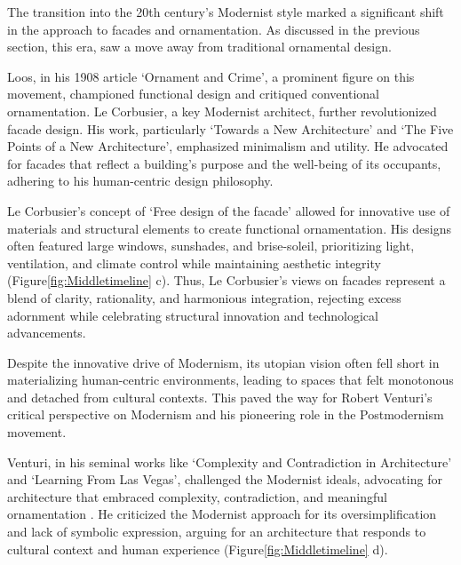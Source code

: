 
The transition into the 20th century's Modernist style marked a significant shift in the approach to facades and ornamentation.
As discussed in the previous section, this era, saw a move away from traditional ornamental design.

Loos, in his 1908 article `Ornament and Crime', a prominent figure on this movement, championed functional design and critiqued conventional ornamentation\cite{Saglam2014}.
Le Corbusier, a key Modernist architect, further revolutionized facade design.
His work, particularly `Towards a New Architecture'\cite{Studio2a2023} and `The Five Points of a New Architecture', emphasized minimalism and utility.
He advocated for facades that reflect a building's purpose and the well-being of its occupants, adhering to his human-centric design philosophy\cite{Virseda2021}.

Le Corbusier's concept of `Free design of the facade'\cite{Corbusier1986} allowed for innovative use of materials and structural elements to create functional ornamentation.
His designs often featured large windows, sunshades, and brise-soleil, prioritizing light, ventilation, and climate control while maintaining aesthetic integrity (Figure\ref{fig:Middletimeline} c).
Thus, Le Corbusier's views on facades represent a blend of clarity, rationality, and harmonious integration, rejecting excess adornment while celebrating structural innovation and technological advancements.


Despite the innovative drive of Modernism, its utopian vision often fell short in materializing human-centric environments, leading to spaces that felt monotonous and detached from cultural contexts.
This paved the way for Robert Venturi's critical perspective on Modernism and his pioneering role in the Postmodernism movement.

Venturi, in his seminal works like `Complexity and Contradiction in Architecture' and `Learning From Las Vegas', challenged the Modernist ideals, advocating for architecture that embraced complexity, contradiction, and meaningful ornamentation \cite{Venturi1977}.
He criticized the Modernist approach for its oversimplification and lack of symbolic expression, arguing for an architecture that responds to cultural context and human experience (Figure\ref{fig:Middletimeline} d).

